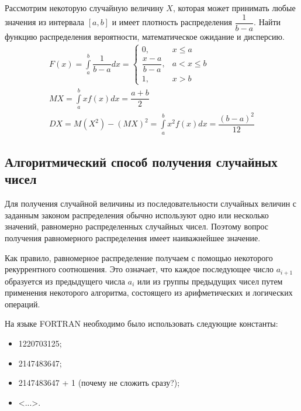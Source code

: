 Рассмотрим некоторую случайную величину $X$, которая может принимать любые значения из интервала $[a, b]$ и имеет плотность распределения $\dfrac{1}{b - a}$. Найти функцию распределения вероятности, математическое ожидание и дисперсию.
%
\begin{gather*}
    F(x) = \int\limits_{a}^b\dfrac{1}{b - a}dx = \begin{cases}
        0,                    & x \leqslant a     \\
        \dfrac{x - a}{b - a}, & a < x \leqslant b \\
        1,                    & x > b
    \end{cases}\\
    MX = \int\limits_{a}^{b}xf(x)dx = \dfrac{a + b}{2}\\
    DX = M(X^2) - (MX)^2 = \int\limits_{a}^{b}x^2f(x)dx = \dfrac{(b - a)^2}{12}
\end{gather*}
%
\subsection{Алгоритмический способ получения случайных чисел}

Для получения случайной величины из последовательности случайных величин с заданным законом распределения обычно используют одно или несколько значений, равномерно распределенных случайных чисел. Поэтому вопрос получения равномерного распределения имеет наиважнейшее значение.

Как правило, равномерное распределение получаем с помощью некоторого рекуррентного соотношения. Это означает, что каждое последующее число $a_{i + 1}$ образуется из предыдущего числа $a_i$ или из группы предыдущих чисел путем применения некоторого алгоритма, состоящего из арифметических и логических операций.

На языке FORTRAN необходимо было использовать следующие константы:

\begin{itemize}
    \item 1220703125;
    \item 2147483647;
    \item 2147483647 + 1 (почему не сложить сразу?);
    \item <...>.
\end{itemize}

